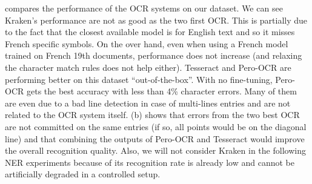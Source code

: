  compares the performance of the OCR systems on our dataset. We can see Kraken's performance are
not as good as the two first OCR. This is partially due to the fact that the closest available model is for English text
and so it misses French specific symbols. On the over hand, even when using a French model trained on French 19th
documents, performance does not increase (and relaxing the character match rules does not help either). Tesseract and
Pero-OCR are performing better on this dataset ``out-of-the-box''. With no fine-tuning, Pero-OCR gets the best accuracy
with less than 4\% character errors. Many of them are even due to a bad line detection in case of multi-lines entries
and are not related to the OCR system itself.  (b) shows that errors from the two best OCR are not
committed on the same entries (if so, all points would be on the diagonal line) and that combining the outputs of
Pero-OCR and Tesseract would improve the overall recognition quality. Also, we will not consider Kraken in the following
NER experiments because of its recognition rate is already low and cannot be artificially degraded in a controlled setup.

